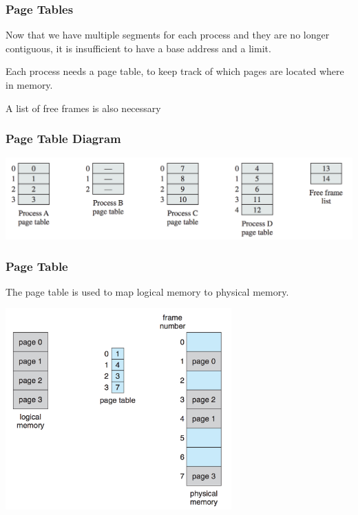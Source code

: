 \begin{frame}
\frametitle{Page Tables}

Now that we have multiple segments for each process and they are no longer contiguous, it is insufficient to have a base address and a limit.

Each process needs a page table, to keep track of which pages are located where in memory. 

A list of free frames is also necessary

\end{frame}

\begin{frame}
\frametitle{Page Table Diagram}

\begin{center}
\includegraphics[width=\textwidth]{images/page-tables.png}
\end{center}


\end{frame}

\begin{frame}
\frametitle{Page Table}

The page table is used to map logical memory to physical memory.

\begin{center}
\includegraphics[width=0.65\textwidth]{images/page-table-mapping.png}
\end{center}

\end{frame}


